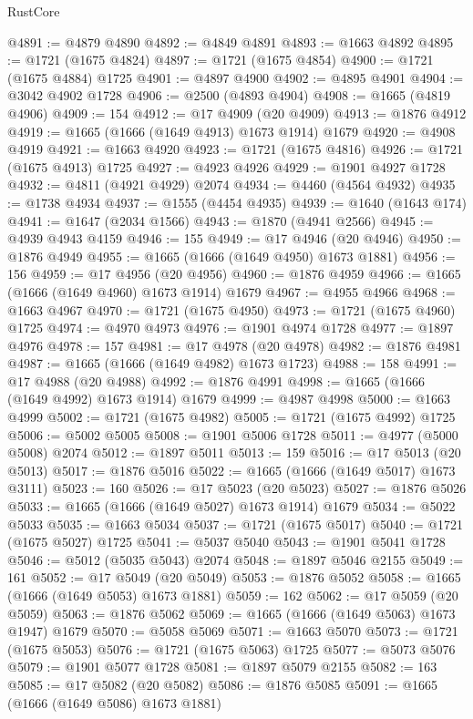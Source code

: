 \begin{lexlean}{RustCore}
\begin{coremodule}
@4891 := @4879 @4890
@4892 := @4849 @4891
@4893 := @1663 @4892
@4895 := @1721 (@1675 @4824)
@4897 := @1721 (@1675 @4854)
@4900 := @1721 (@1675 @4884) @1725
@4901 := @4897 @4900
@4902 := @4895 @4901
@4904 := @3042 @4902 @1728
@4906 := @2500 (@4893 @4904)
@4908 := @1665 (@4819 @4906)
@4909 := 154
@4912 := @17 @4909 (@20 @4909)
@4913 := @1876 @4912
@4919 := @1665 (@1666 (@1649 @4913) @1673 @1914) @1679
@4920 := @4908 @4919
@4921 := @1663 @4920
@4923 := @1721 (@1675 @4816)
@4926 := @1721 (@1675 @4913) @1725
@4927 := @4923 @4926
@4929 := @1901 @4927 @1728
@4932 := @4811 (@4921 @4929) @2074
@4934 := @4460 (@4564 @4932)
@4935 := @1738 @4934
@4937 := @1555 (@4454 @4935)
@4939 := @1640 (@1643 @174)
@4941 := @1647 (@2034 @1566)
@4943 := @1870 (@4941 @2566)
@4945 := @4939 @4943 @4159
@4946 := 155
@4949 := @17 @4946 (@20 @4946)
@4950 := @1876 @4949
@4955 := @1665 (@1666 (@1649 @4950) @1673 @1881)
@4956 := 156
@4959 := @17 @4956 (@20 @4956)
@4960 := @1876 @4959
@4966 := @1665 (@1666 (@1649 @4960) @1673 @1914) @1679
@4967 := @4955 @4966
@4968 := @1663 @4967
@4970 := @1721 (@1675 @4950)
@4973 := @1721 (@1675 @4960) @1725
@4974 := @4970 @4973
@4976 := @1901 @4974 @1728
@4977 := @1897 @4976
@4978 := 157
@4981 := @17 @4978 (@20 @4978)
@4982 := @1876 @4981
@4987 := @1665 (@1666 (@1649 @4982) @1673 @1723)
@4988 := 158
@4991 := @17 @4988 (@20 @4988)
@4992 := @1876 @4991
@4998 := @1665 (@1666 (@1649 @4992) @1673 @1914) @1679
@4999 := @4987 @4998
@5000 := @1663 @4999
@5002 := @1721 (@1675 @4982)
@5005 := @1721 (@1675 @4992) @1725
@5006 := @5002 @5005
@5008 := @1901 @5006 @1728
@5011 := @4977 (@5000 @5008) @2074
@5012 := @1897 @5011
@5013 := 159
@5016 := @17 @5013 (@20 @5013)
@5017 := @1876 @5016
@5022 := @1665 (@1666 (@1649 @5017) @1673 @3111)
@5023 := 160
@5026 := @17 @5023 (@20 @5023)
@5027 := @1876 @5026
@5033 := @1665 (@1666 (@1649 @5027) @1673 @1914) @1679
@5034 := @5022 @5033
@5035 := @1663 @5034
@5037 := @1721 (@1675 @5017)
@5040 := @1721 (@1675 @5027) @1725
@5041 := @5037 @5040
@5043 := @1901 @5041 @1728
@5046 := @5012 (@5035 @5043) @2074
@5048 := @1897 @5046 @2155
@5049 := 161
@5052 := @17 @5049 (@20 @5049)
@5053 := @1876 @5052
@5058 := @1665 (@1666 (@1649 @5053) @1673 @1881)
@5059 := 162
@5062 := @17 @5059 (@20 @5059)
@5063 := @1876 @5062
@5069 := @1665 (@1666 (@1649 @5063) @1673 @1947) @1679
@5070 := @5058 @5069
@5071 := @1663 @5070
@5073 := @1721 (@1675 @5053)
@5076 := @1721 (@1675 @5063) @1725
@5077 := @5073 @5076
@5079 := @1901 @5077 @1728
@5081 := @1897 @5079 @2155
@5082 := 163
@5085 := @17 @5082 (@20 @5082)
@5086 := @1876 @5085
@5091 := @1665 (@1666 (@1649 @5086) @1673 @1881)

\end{coremodule}
\end{lexlean}
